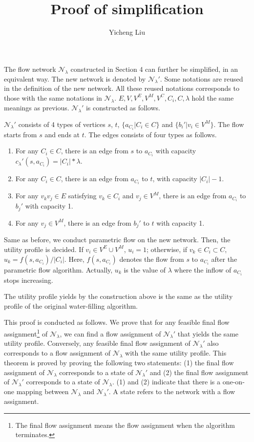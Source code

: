 \documentclass[10pt,a4paper]{article}
\author{Yicheng Liu}
\title{Proof of simplification}
\begin{document}
The flow network $\mathcal{N_\lambda}$ constructed in Section 4 can further be simplified, in an equivalent way. The new network is denoted by $\mathcal{N_\lambda'}$. Some notations are reused in the definition of the new network. All these reused notations corresponds to those with the same notations in $\mathcal{N_\lambda}$. $E,V,V^E,V^M,V^C,C_i,C,\lambda$ hold the same meanings as previous. $\mathcal{N_\lambda'}$ is constructed as follows.

$\mathcal{N_\lambda'}$ consists of 4 types of vertices $s$, $t$, $\{a_{C_i}|C_i\in C\}$ and $\{b_i'|v_i\in V^M\}$. The flow starts from $s$ and ends at $t$. The edges consists of four types as follows.
\begin{enumerate}
	\item For any $C_i\in C$, there is an edge from $s$ to $a_{C_i}$ with capacity $c_\lambda'(s,a_{C_i})=|C_i|*\lambda$.
	\item For any $C_i\in C$, there is an edge from $a_{C_i}$ to $t$, with capacity $|C_i|-1$.
	\item For any $v_kv_j\in E$ satisfying $v_k\in C_i$ and $v_j\in V^M$, there is an edge from $a_{C_i}$ to $b_j'$ with capacity 1.
	\item For any $v_j\in V^M$, there is an edge from $b_j'$ to $t$ with capacity 1.
\end{enumerate}

Same as before, we conduct parametric flow on the new network. Then, the utility profile is decided. If $v_i\in V^E\cup V^M$, $u_i=1$; otherwise, if $v_k\in C_i \subset C$, $u_k=f(s,a_{C_i})/|C_i|$. Here, $f(s,a_{C_i})$ denotes the flow from $s$ to $a_{C_i}$ after the parametric flow algorithm. Actually,  $u_k$ is the value of $\lambda$ where the inflow of $a_{C_i}$ stops increasing. 

\begin{theorem}
	The utility profile yields by the construction above is the same as the utility profile of the original water-filling algorithm.
\end{theorem}

This proof is conducted as follows. We prove that for any feasible final flow assignment\footnote{The final flow assignment means the flow assignment when the algorithm terminates.} of $\mathcal{N_\lambda}$, we can find a flow assignment of $\mathcal{N_\lambda}'$ that yields the same utility profile. Conversely, any feasible final flow assignment of $\mathcal{N_\lambda}'$ also corresponds to a flow assignment of $\mathcal{N_\lambda}$ with the same utility profile.
This theorem is proved by proving the following two statements: (1) the final flow assignment of $\mathcal{N_\lambda}$ corresponds to a state of $\mathcal{N_\lambda}'$ and (2) the final flow assignment of $\mathcal{N_\lambda}'$ corresponds to a state of $\mathcal{N_\lambda}$. (1) and (2) indicate that there is a one-on-one mapping between $\mathcal{N_\lambda}$ and $\mathcal{N_\lambda}'$. A state refers to the network with a flow assignment.
\end{document}
